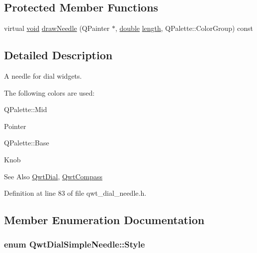 \subsection*{Protected Member Functions}
\begin{DoxyCompactItemize}
\item 
virtual \hyperlink{group___u_a_v_objects_plugin_ga444cf2ff3f0ecbe028adce838d373f5c}{void} \hyperlink{class_qwt_dial_simple_needle_a0eff8832707ff968d17eddf478d6a771}{draw\-Needle} (Q\-Painter $\ast$, \hyperlink{_super_l_u_support_8h_a8956b2b9f49bf918deed98379d159ca7}{double} \hyperlink{glext_8h_a3c8469415bbc83dd1341af15c67f1cef}{length}, Q\-Palette\-::\-Color\-Group) const 
\end{DoxyCompactItemize}


\subsection{Detailed Description}
A needle for dial widgets. 

The following colors are used\-:


\begin{DoxyItemize}
\item Q\-Palette\-::\-Mid\par
 Pointer
\item Q\-Palette\-::\-Base\par
 Knob
\end{DoxyItemize}

\begin{DoxySeeAlso}{See Also}
\hyperlink{class_qwt_dial}{Qwt\-Dial}, \hyperlink{class_qwt_compass}{Qwt\-Compass} 
\end{DoxySeeAlso}


Definition at line 83 of file qwt\-\_\-dial\-\_\-needle.\-h.



\subsection{Member Enumeration Documentation}
\hypertarget{class_qwt_dial_simple_needle_ad28821489e04f1fd942e5bebc8a60584}{
\subsubsection[{Style}]{\setlength{\rightskip}{0pt plus 5cm}enum {\bf Qwt\-Dial\-Simple\-Needle\-::\-Style}}}\label{class_qwt_dial_simple_needle_ad28821489e04f1fd942e5bebc8a60584}


